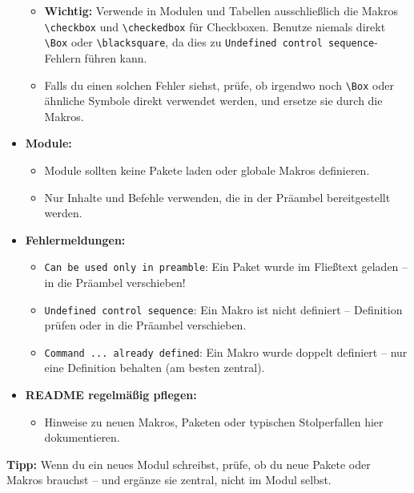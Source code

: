 \begin{itemize}
\begin{itemize}
\begin{Shaded}
\end{Shaded}
  \item
    \textbf{Wichtig:} Verwende in Modulen und Tabellen ausschließlich die Makros \texttt{\textbackslash{}checkbox} und \texttt{\textbackslash{}checkedbox} für Checkboxen. Benutze niemals direkt \texttt{\textbackslash{}Box} oder \texttt{\textbackslash{}blacksquare}, da dies zu \texttt{Undefined\ control\ sequence}-Fehlern führen kann.
  \item
    Falls du einen solchen Fehler siehst, prüfe, ob irgendwo noch \texttt{\textbackslash{}Box} oder ähnliche Symbole direkt verwendet werden, und ersetze sie durch die Makros.
  \end{itemize}
\item
  \textbf{Module:}

  \begin{itemize}
  \tightlist
  \item
    Module sollten keine Pakete laden oder globale Makros definieren.
  \item
    Nur Inhalte und Befehle verwenden, die in der Präambel bereitgestellt werden.
  \end{itemize}
\item
  \textbf{Fehlermeldungen:}

  \begin{itemize}
  \tightlist
  \item
    \texttt{Can\ be\ used\ only\ in\ preamble}: Ein Paket wurde im Fließtext geladen -- in die Präambel verschieben!
  \item
    \texttt{Undefined\ control\ sequence}: Ein Makro ist nicht definiert -- Definition prüfen oder in die Präambel verschieben.
  \item
    \texttt{Command\ ...\ already\ defined}: Ein Makro wurde doppelt definiert -- nur eine Definition behalten (am besten zentral).
  \end{itemize}
\item
  \textbf{README regelmäßig pflegen:}

  \begin{itemize}
  \tightlist
  \item
    Hinweise zu neuen Makros, Paketen oder typischen Stolperfallen hier dokumentieren.
  \end{itemize}
\end{itemize}

\textbf{Tipp:}
Wenn du ein neues Modul schreibst, prüfe, ob du neue Pakete oder Makros brauchst -- und ergänze sie zentral, nicht im Modul selbst.
